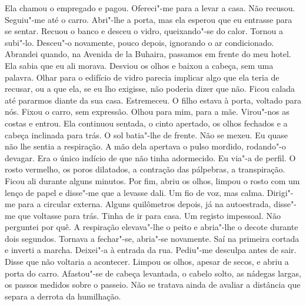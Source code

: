 Ela chamou o empregado e pagou. Ofereci"-me para a levar a casa. Não
recusou. Seguiu"-me até o carro. Abri"-lhe a porta, mas ela esperou que
eu entrasse para se sentar. Recuou o banco e desceu o vidro,
queixando"-se do calor. Tornou a subi"-lo. Desceu"-o novamente, pouco
depois, ignorando o ar condicionado. Abrandei quando, na Avenida de la
Buhaira, passamos em frente do meu hotel. Ela sabia que eu ali morava.
Desviou os olhos e baixou a cabeça, sem uma palavra. Olhar para o
edifício de vidro parecia implicar algo que ela teria de recusar, ou a
que ela, se eu lho exigisse, não poderia dizer que não. Ficou calada até
pararmos diante da sua casa. Estremeceu. O filho estava à porta, voltado
para nós. Fixou o carro, sem expressão. Olhou para mim, para a mãe.
Virou"-nos as costas e entrou. Ela continuou sentada, o cinto apertado,
os olhos fechados e a cabeça inclinada para trás. O sol batia"-lhe de
frente. Não se mexeu. Eu quase não lhe sentia a respiração. A mão dela
apertava o pulso mordido, rodando"-o devagar. Era o único indício de que
não tinha adormecido. Eu via"-a de perfil. O rosto vermelho, os poros
dilatados, a contração das pálpebras, a transpiração. Ficou ali durante
alguns minutos. Por fim, abriu os olhos, limpou o rosto com um lenço de
papel e disse"-me que a levasse dali. Um fio de voz, mas calma.
Dirigi"-me para a circular externa. Alguns quilômetros depois, já na
autoestrada, disse"-me que voltasse para trás. Tinha de ir para casa.
Um registo impessoal. Não perguntei por quê. A respiração elevava"-lhe o
peito e abria"-lhe o decote durante dois segundos. Tornava a fechar"-se,
abria"-se novamente. Saí na primeira cortada e inverti a marcha.
Deixei"-a à entrada da rua. Pediu"-me desculpa antes de sair. Disse que
não voltaria a acontecer. Limpou os olhos, apesar de secos, e abriu a
porta do carro. Afastou"-se de cabeça levantada, o cabelo solto, as
nádegas largas, os passos medidos sobre o passeio. Não se tratava ainda
de avaliar a distância que separa a derrota da humilhação.

